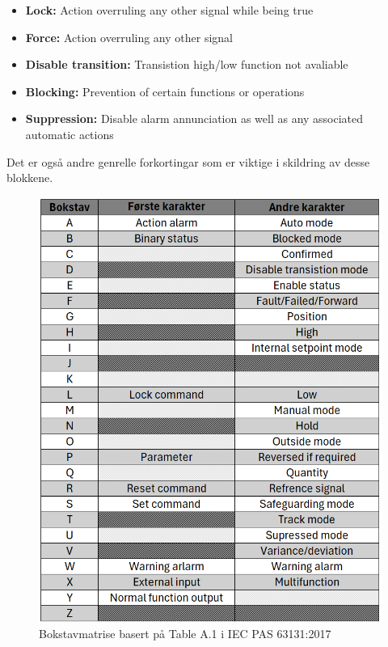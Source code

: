 \begin{itemize}
    \item \textbf{Lock:} Action overruling any other signal while being true
    \item \textbf{Force:} Action overruling any other signal                        
    \item \textbf{Disable transition:} Transistion high/low function not avaliable  
    \item \textbf{Blocking:} Prevention of certain functions or operations          
    \item \textbf{Suppression:} Disable alarm annunciation as well as any associated automatic actions
\end{itemize}
Det er også andre genrelle forkortingar som er viktige i skildring av desse blokkene.
\begin{figure}[htbp]
    \centering
    \includegraphics[scale=0.33]{Figurar/IEC bokstavmatrise.png}
    \caption{Bokstavmatrise basert på Table A.1 i \gls{IEC} \gls{PAS} 63131:2017 \citep{A1}}\label{fig:SBE tilstandsmaskin}
\end{figure}

